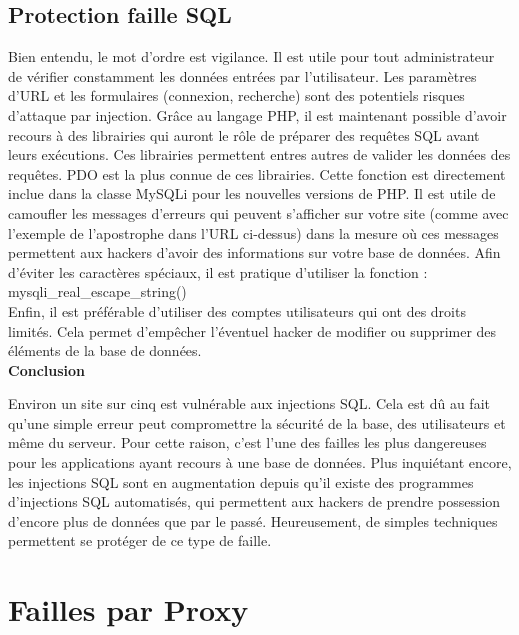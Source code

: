 \newpage
\subsection{Protection faille SQL}

Bien entendu, le mot d’ordre est vigilance. Il est utile pour tout administrateur de vérifier constamment les données entrées par l’utilisateur. Les paramètres d’URL et les formulaires (connexion, recherche) sont des potentiels risques d’attaque par injection.
Grâce au langage PHP, il est maintenant possible d’avoir recours à des librairies qui auront le rôle de préparer des requêtes SQL avant leurs exécutions. Ces librairies permettent entres autres de valider les données des requêtes.
PDO est la plus connue de ces librairies. Cette fonction est directement inclue dans la classe MySQLi pour les nouvelles versions de PHP.
Il est utile de camoufler les messages d’erreurs qui peuvent s’afficher sur votre site (comme avec l’exemple de l’apostrophe dans l’URL ci-dessus) dans la mesure où ces messages permettent aux hackers d’avoir des informations sur votre base de données. 
Afin d’éviter les caractères spéciaux, il est pratique d’utiliser la fonction :\\ mysqli\_real\_escape\_string()\\
Enfin, il est préférable d’utiliser des comptes utilisateurs qui ont des droits limités. Cela permet d’empêcher l'éventuel hacker de modifier ou supprimer des éléments de la base de données.\\

\noindent \textbf{Conclusion}

Environ un site sur cinq est vulnérable aux injections SQL. Cela est dû au fait qu’une simple erreur peut compromettre la sécurité de la base, des utilisateurs et même du serveur. Pour cette raison, c’est l’une des failles les plus dangereuses pour les applications ayant recours à une base de données. Plus inquiétant encore, les injections SQL sont en augmentation depuis qu'il existe des programmes d'injections SQL automatisés, qui permettent aux hackers de prendre possession d’encore plus de données que par le passé. Heureusement, de simples techniques permettent se protéger de ce type de faille.







\newpage
\section{Failles par Proxy}

